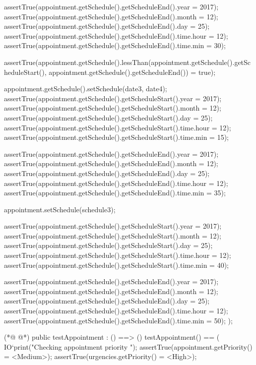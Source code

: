 \begin{vdmpp}[breaklines=true]
   assertTrue(appointment.getSchedule().getScheduleEnd().year = 2017);
   assertTrue(appointment.getSchedule().getScheduleEnd().month = 12);
   assertTrue(appointment.getSchedule().getScheduleEnd().day = 25);
   assertTrue(appointment.getSchedule().getScheduleEnd().time.hour = 12);
   assertTrue(appointment.getSchedule().getScheduleEnd().time.min = 30);
   
   assertTrue(appointment.getSchedule().lessThan(appointment.getSchedule().getScheduleStart(), appointment.getSchedule().getScheduleEnd()) = true);
   
   appointment.getSchedule().setSchedule(date3, date4);
   assertTrue(appointment.getSchedule().getScheduleStart().year = 2017);
   assertTrue(appointment.getSchedule().getScheduleStart().month = 12);
   assertTrue(appointment.getSchedule().getScheduleStart().day = 25);
   assertTrue(appointment.getSchedule().getScheduleStart().time.hour = 12);
   assertTrue(appointment.getSchedule().getScheduleStart().time.min = 15);
   
   assertTrue(appointment.getSchedule().getScheduleEnd().year = 2017);
   assertTrue(appointment.getSchedule().getScheduleEnd().month = 12);
   assertTrue(appointment.getSchedule().getScheduleEnd().day = 25);
   assertTrue(appointment.getSchedule().getScheduleEnd().time.hour = 12);
   assertTrue(appointment.getSchedule().getScheduleEnd().time.min = 35);
   
   appointment.setSchedule(schedule3);
   
   assertTrue(appointment.getSchedule().getScheduleStart().year = 2017);
   assertTrue(appointment.getSchedule().getScheduleStart().month = 12);
   assertTrue(appointment.getSchedule().getScheduleStart().day = 25);
   assertTrue(appointment.getSchedule().getScheduleStart().time.hour = 12);
   assertTrue(appointment.getSchedule().getScheduleStart().time.min = 40);
   
   assertTrue(appointment.getSchedule().getScheduleEnd().year = 2017);
   assertTrue(appointment.getSchedule().getScheduleEnd().month = 12);
   assertTrue(appointment.getSchedule().getScheduleEnd().day = 25);
   assertTrue(appointment.getSchedule().getScheduleEnd().time.hour = 12);
   assertTrue(appointment.getSchedule().getScheduleEnd().time.min = 50);
  );
  
(*@
\label{testAppointment:186}
@*)
 public testAppointment : () ==> ()
  testAppointment() == (
   IO`print("\n Checking appointment priority \n");
   assertTrue(appointment.getPriority() = <Medium>);
   assertTrue(urgencies.getPriority() = <High>);
   

\end{vdmpp}
